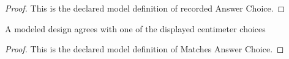 \begin{proof}
  This is the declared model definition of recorded Answer Choice.
\end{proof}
\begin{definition}
  \label{def:physics:phyx-mini-0283:phyxminiproblems-problemphyxmini0283-matchesanswerchoice}
  A modeled design agrees with one of the displayed centimeter choices
\end{definition}
\begin{proof}
  This is the declared model definition of Matches Answer Choice.
\end{proof}
